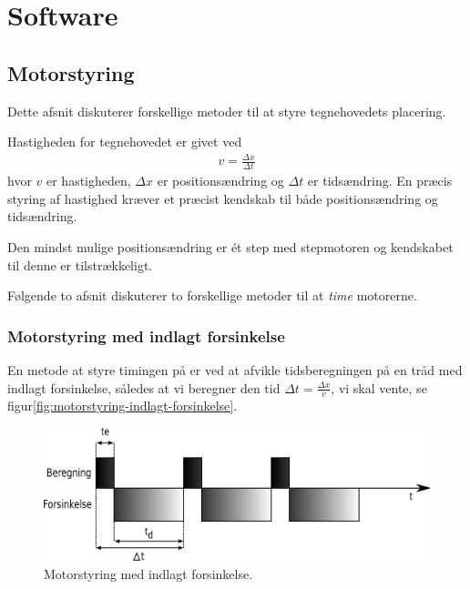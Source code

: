 \chapter[Design af software]{Software}



\section{Motorstyring}


Dette afsnit diskuterer forskellige metoder til at styre tegnehovedets
placering.

Hastigheden for tegnehovedet er givet ved
\begin{align}
  v = \frac{\Delta x}{\Delta t} \label{eq:hastighed}
\end{align}
hvor $v$ er hastigheden, $\Delta x$ er positionsændring og $\Delta t$ er
tidsændring. En præcis styring af hastighed kræver et præcist kendskab
til både positionsændring og tidsændring.

Den mindst mulige positionsændring er ét step med stepmotoren og
kendskabet til denne er tilstrækkeligt.

Følgende to afsnit diskuterer to forskellige metoder til at
\textit{time} motorerne.


\subsection{Motorstyring med indlagt forsinkelse}

En metode at styre timingen på er ved at afvikle tidsberegningen på en
tråd med indlagt forsinkelse, således at vi beregner den tid $\Delta t
= \frac{\Delta x}{v}$, vi skal vente, se
figur\vref{fig:motorstyring-indlagt-forsinkelse}.

\begin{figure}[htbp]
  \centering
  \includegraphics[width=.8\textwidth]{./img/motorstyring-indlagt-forsinkelse}
  \caption{Motorstyring med indlagt forsinkelse.}
  \label{fig:motorstyring-indlagt-forsinkelse}
\end{figure}


